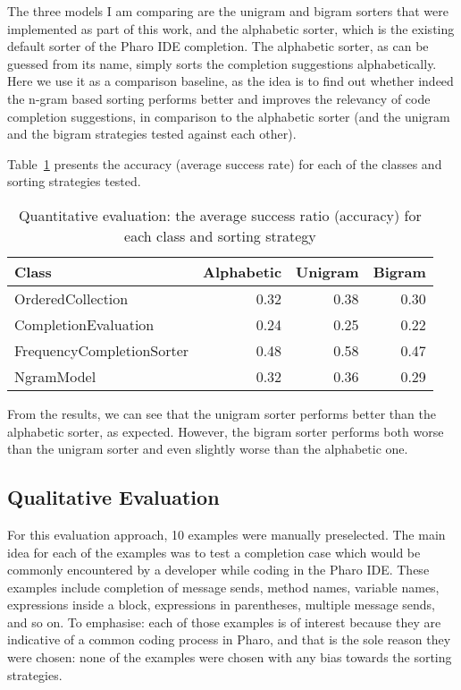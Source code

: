 \documentclass[sigplan,screen]{acmart}
\begin{document}
The three models I am comparing are the unigram and bigram sorters that were implemented as part of this work, and the alphabetic sorter, which is the existing default sorter of the Pharo IDE completion. The alphabetic sorter, as can be guessed from its name, simply sorts the completion suggestions alphabetically. Here we use it as a comparison baseline, as the idea is to find out whether indeed the n-gram based sorting performs better and improves the relevancy of code completion suggestions, in comparison to the alphabetic sorter (and the unigram and the bigram strategies tested against each other).

Table~\ref{table:quan1} presents the accuracy (average success rate) for each of the classes and sorting strategies tested.

\begin{table}[H]
    \centering
    \small
    \setlength\tabcolsep{2pt}
    \begin{tabular}{lrrr}
    \hline
    \textbf{Class} & \textbf{Alphabetic} & \textbf{Unigram} & \textbf{Bigram} \\ \hline
    OrderedCollection & 0.32 & 0.38 & 0.30 \\ 
    CompletionEvaluation & 0.24 & 0.25 & 0.22 \\ 
    FrequencyCompletionSorter & 0.48 & 0.58 & 0.47 \\ 
    NgramModel & 0.32 & 0.36 & 0.29 \\ \hline
    \end{tabular}
\caption{Quantitative evaluation: the average success ratio (accuracy) for each class and sorting strategy}
\label{table:quan1}
\end{table}

From the results, we can see that the unigram sorter performs better than the alphabetic sorter, as expected. However, the bigram sorter performs both worse than the unigram sorter and even slightly worse than the alphabetic one.

\subsection{Qualitative Evaluation}
For this evaluation approach, 10 examples were manually preselected. The main idea for each of the examples was to test a completion case which would be commonly encountered by a developer while coding in the Pharo IDE. These examples include completion of message sends, method names, variable names, expressions inside a block, expressions in parentheses, multiple message sends, and so on. To emphasise: each of those examples is of interest because they are indicative of a common coding process in Pharo, and that is the sole reason they were chosen: none of the examples were chosen with any bias towards the sorting strategies. 
\end{document}
